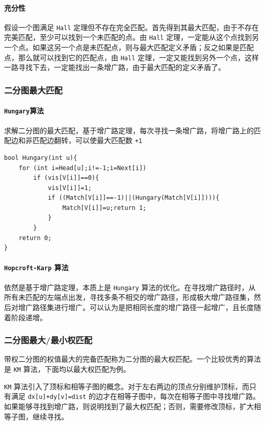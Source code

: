 \documentclass[UTF-8]{ctexart}
\begin{document}
	\paragraph{充分性} 假设一个图满足 \texttt{Hall} 定理但不存在完全匹配。首先得到其最大匹配，由于不存在完美匹配，至少可以找到一个未匹配的点。由 \texttt{Hall} 定理，一定能从这个点找到另一个点。如果这另一个点是未匹配点，则与最大匹配定义矛盾；反之如果是匹配点，那么就可以找到它的匹配点，由 \texttt{Hall} 定理，一定又能找到另外一个点，这样一路寻找下去，一定能找出一条增广路，由于最大匹配的定义矛盾了。
		
	\subsubsection{二分图最大匹配}
	\paragraph{\texttt{Hungary}算法} 求解二分图的最大匹配，基于增广路定理，每次寻找一条增广路，将增广路上的匹配边和非匹配边翻转，可以使最大匹配数 \texttt{+1}
\begin{verbatim}
bool Hungary(int u){
    for (int i=Head[u];i!=-1;i=Next[i])
        if (vis[V[i]]==0){
            vis[V[i]]=1;
            if ((Match[V[i]]==-1)||(Hungary(Match[V[i]]))){
                Match[V[i]]=u;return 1;
            }
        }
    return 0;
}
\end{verbatim}
	\paragraph{\texttt{Hopcroft-Karp} 算法} 依然是基于增广路定理，本质上是 \texttt{Hungary} 算法的优化。在寻找增广路径时，从所有未匹配的左端点出发，寻找多条不相交的增广路径，形成极大增广路径集，然后对增广路径集进行增广。可以认为是把相同长度的增广路径一起增广，且长度随着阶段递增。
	\subsubsection{二分图最大/最小权匹配}
	带权二分图的权值最大的完备匹配称为二分图的最大权匹配。一个比较优秀的算法是 \texttt{KM} 算法，下面均以最大权匹配为例。
	
	\texttt{KM} 算法引入了顶标和相等子图的概念。对于左右两边的顶点分别维护顶标，而只有满足 \texttt{dx[u]+dy[v]=dist} 的边才在相等子图中，每次在相等子图中寻找增广路。如果能够寻找到增广路，则说明找到了最大权匹配；否则，需要修改顶标，扩大相等子图，继续寻找。
	
\end{document}
